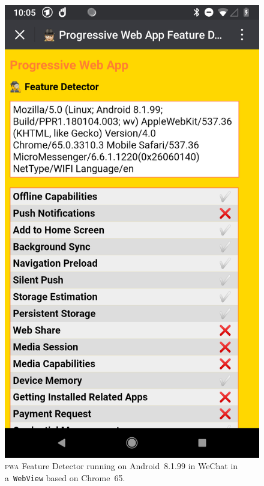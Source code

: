 \documentclass[sigconf]{acmart}
\begin{document}
\begin{figure}[hbt]
  \centering
  \includegraphics[width=\columnwidth,frame]{pwa-feature-detector-wechat-android-chrome65}
  \caption[\textsc{pwa} Feature Detector running in WeChat.]{
    \textsc{pwa} Feature Detector running on Android~8.1.99 in WeChat
    in a~\texttt{WebView} based on Chrome~65.}
  \label{fig:wechat-android-chrome65}
\end{figure}
\end{document}
